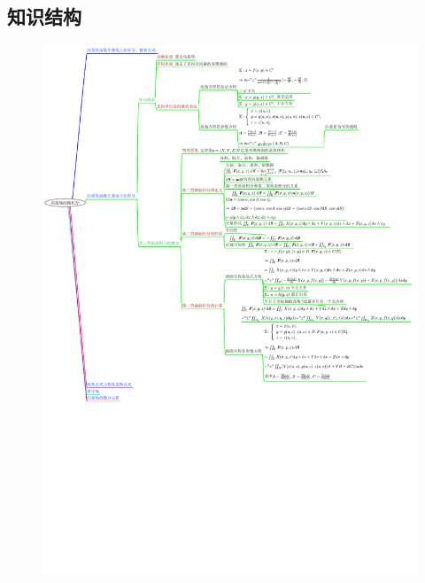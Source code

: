 \documentclass[12pt,UTF8,fleqn]{ctexart}
\begin{document}
\subsection{知识结构}
\begin{figure}[H]
\begin{center}
\includegraphics[height=1\textheight,angle=0]{20190613.pdf}
\end{center}
\end{figure}
\end{document}
